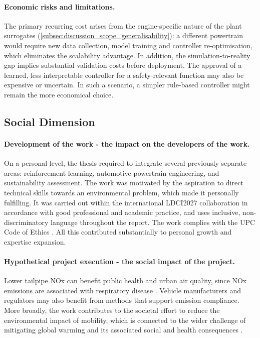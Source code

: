 \paragraph{Economic risks and limitations.} The primary recurring cost arises from the engine-specific nature of the plant surrogates (\autoref{subsec:discussion_scope_generalisability}): a different powertrain would require new data collection, model training and controller re-optimisation, which eliminates the scalability advantage. In addition, the simulation-to-reality gap implies substantial validation costs before deployment. The approval of a learned, less interpretable controller for a safety-relevant function may also be expensive or uncertain. In such a scenario, a simpler rule-based controller might remain the more economical choice.

\subsection{Social Dimension}

\paragraph{Development of the work - the impact on the developers of the work.} On a personal level, the thesis required to integrate several previously separate areas: reinforcement learning, automotive powertrain engineering, and sustainability assessment. The work was motivated by the aspiration to direct technical skills towards an environmental problem, which made it personally fulfilling. It was carried out within the international \ac{LDCI2027} collaboration in accordance with good professional and academic practice, and uses inclusive, non-discriminatory language throughout the report. The work complies with the UPC Code of Ethics \cite{universitat_politecnica_de_catalunya_code_2022}. All this contributed substantially to personal growth and expertise expansion.

\paragraph{Hypothetical project execution - the social impact of the project.} Lower tailpipe \ac{NOx} can benefit public health and urban air quality, since \ac{NOx} emissions are associated with respiratory disease \cite{european_union_regulation_2024, european_union_regulation_2007, core_writing_team_climate_2023}. Vehicle manufacturers and regulators may also benefit from methods that support emission compliance. More broadly, the work contributes to the societal effort to reduce the environmental impact of mobility, which is connected to the wider challenge of mitigating global warming and its associated social and health consequences \cite{core_writing_team_climate_2023}.

